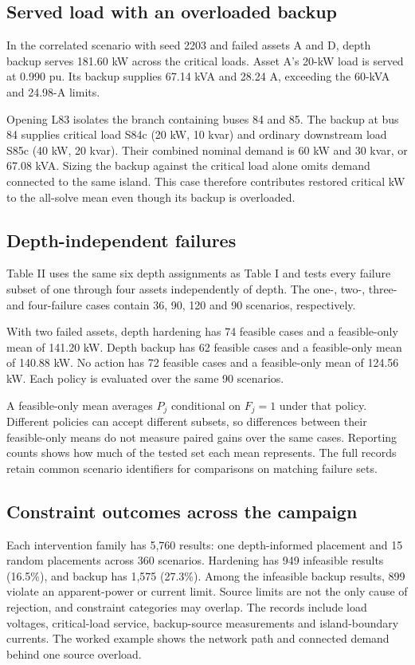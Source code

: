 \documentclass[conference]{IEEEtran}
\begin{document}
\subsection{Served load with an overloaded backup}

In the correlated scenario with seed 2203 and failed assets A and D, depth backup serves 181.60 kW across the critical loads. Asset A's 20-kW load is served at 0.990 pu. Its backup supplies 67.14 kVA and 28.24 A, exceeding the 60-kVA and 24.98-A limits.

Opening L83 isolates the branch containing buses 84 and 85. The backup at bus 84 supplies critical load S84c (20 kW, 10 kvar) and ordinary downstream load S85c (40 kW, 20 kvar). Their combined nominal demand is 60 kW and 30 kvar, or 67.08 kVA. Sizing the backup against the critical load alone omits demand connected to the same island. This case therefore contributes restored critical kW to the all-solve mean even though its backup is overloaded.

\subsection{Depth-independent failures}

Table II uses the same six depth assignments as Table I and tests every failure subset of one through four assets independently of depth. The one-, two-, three- and four-failure cases contain 36, 90, 120 and 90 scenarios, respectively.

With two failed assets, depth hardening has 74 feasible cases and a feasible-only mean of 141.20 kW. Depth backup has 62 feasible cases and a feasible-only mean of 140.88 kW. No action has 72 feasible cases and a feasible-only mean of 124.56 kW. Each policy is evaluated over the same 90 scenarios.

A feasible-only mean averages $P_j$ conditional on $F_j=1$ under that policy. Different policies can accept different subsets, so differences between their feasible-only means do not measure paired gains over the same cases. Reporting counts shows how much of the tested set each mean represents. The full records retain common scenario identifiers for comparisons on matching failure sets.

\subsection{Constraint outcomes across the campaign}

Each intervention family has 5,760 results: one depth-informed placement and 15 random placements across 360 scenarios. Hardening has 949 infeasible results (16.5\%), and backup has 1,575 (27.3\%). Among the infeasible backup results, 899 violate an apparent-power or current limit. Source limits are not the only cause of rejection, and constraint categories may overlap. The records include load voltages, critical-load service, backup-source measurements and island-boundary currents. The worked example shows the network path and connected demand behind one source overload.
\end{document}
